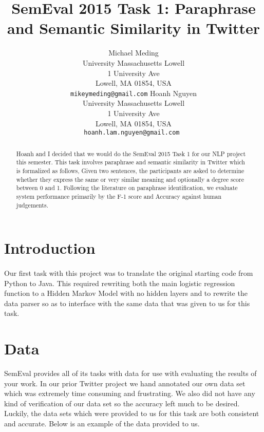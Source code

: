 \documentclass[11pt,letterpaper]{article}
\title{SemEval 2015 Task 1: Paraphrase and Semantic Similarity in Twitter}
\author{
	Michael Meding\\
  	University Massachusetts Lowell\\
	1 University Ave\\
	Lowell, MA 01854, USA\\
   {\tt mikeymeding@gmail.com}
	\And  
   Hoanh Nguyen\\
	University Massachusetts Lowell\\
	1 University Ave\\
	Lowell, MA 01854, USA\\
	{\tt hoanh.lam.nguyen@gmail.com }
}
\date{}
\begin{document}
\maketitle
\begin{abstract}
Hoanh and I decided that we would do the SemEval 2015 Task 1 for our NLP project this semester. This task involves paraphrase and semantic similarity in Twitter which is formalized as follows, Given two sentences, the participants are asked to determine whether they express the same or very similar meaning and optionally a degree score between 0 and 1. Following the literature on paraphrase identification, we evaluate system performance primarily by the F-1 score and Accuracy against human judgements. 
\end{abstract}

\section{Introduction}
\paragraph{} 
Our first task with this project was to translate the original starting code from Python to Java. This required rewriting both the main logistic regression function to a Hidden Markov Model with no hidden layers and to rewrite the data parser so as to interface with the same data that was given to us for this task.


\section{Data}
SemEval provides all of its tasks with data for use with evaluating the results of your work. In our prior Twitter project we hand annotated our own data set which was 
extremely time consuming and frustrating. We also did not have any kind of verification of our data set so the accuracy left much to be desired. Luckily, the data sets which were provided to us for this task are both consistent and accurate. Below is an example of the data provided to us.


\end{document}
